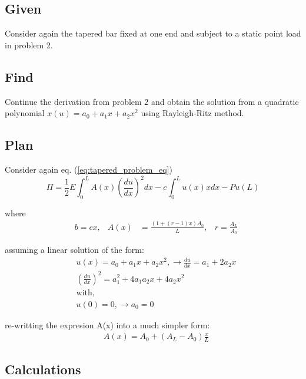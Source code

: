 \documentclass[a4paper]{memoir}
\begin{document}
\subsection{Given}
Consider again the tapered bar fixed at one end and subject to a static point load in problem 2.

\subsection{Find}
Continue the derivation from problem 2 and obtain the solution from a quadratic polynomial $x(u) = a_0+a_1x+a_2x^2$ using Rayleigh-Ritz method.

\subsection{Plan}
Consider again eq. (\ref{eq:tapered_problem_eq}) 
\begin{equation}
	\Pi = \frac{1}{2} E \int^L_0 A(x) \left( \frac{du}{dx} \right)^2dx - c\int^L_0 u(x)xdx - Pu(L)
\end{equation}

where
\begin{align*}
	& b = cx, & A(x) &= \frac{(1+(r-1)x)A_0}{L}, & r = \frac{A_L}{A_0}
\end{align*}

assuming a linear solution of the form: 
\begin{align*}
	& u(x) = a_0+a_1x+a_2x^2, \rightarrow \frac{du}{dx} = a_1+2a_2x \\
	& \left( \frac{du}{dx} \right)^2 = a_1^2+4a_1a_2x+4a_2x^2 \\
	& \text{with,} \\
	& u(0) = 0, 	\rightarrow a_0 = 0
\end{align*}
 
re-writting the expresion A(x) into a much simpler form:
\begin{align*}
	& A(x) = A_0 + (A_L-A_0)\frac{x}{L}
\end{align*}

\subsection{Calculations}
\end{document}

